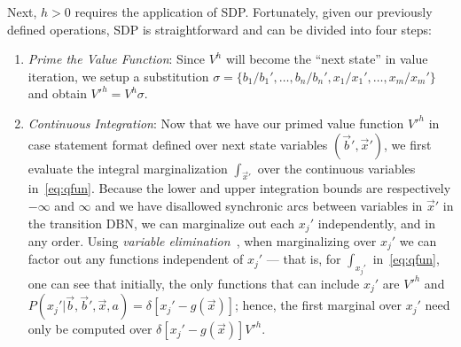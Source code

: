 \documentclass[letterpaper]{article}
\begin{document}
Next, $h > 0$ requires the application of SDP.  
Fortunately, given our previously defined
operations, SDP is straightforward and can be divided into four 
steps: 
\begin{enumerate}
\item {\it Prime the Value Function}: Since $V^{h}$ will become
the ``next state'' in value iteration, we setup a substitution
$\sigma = \{ b_1 / b_1', \ldots, b_n / b_n', x_1 / x_1', \ldots, x_m / x_m' \}$
and obtain $V'^{h} = V^{h}\sigma$.

\item {\it Continuous Integration}: Now that we have our primed value
function $V'^{h}$ in case statement format defined over next state
variables $(\vec{b}',\vec{x}')$, we first evaluate the integral
marginalization $\int_{\vec{x}'}$ over the continuous variables
in~\eqref{eq:qfun}.  Because the lower and upper integration bounds
are respectively $-\infty$ and $\infty$
and we have
disallowed synchronic arcs between variables in $\vec{x}'$ 
in the transition DBN, we can marginalize out each
$x_j'$ independently, and in any order.  Using 
\emph{variable elimination}~\cite{varelim}, when marginalizing
over $x_j'$ we can factor out any functions independent of $x_j'$ --- 
that is, for $\int_{x_j'}$ in~\eqref{eq:qfun}, 
one can see that initially, 
the only functions that can include $x_j'$ are $V'^{h}$
and $P(x_j'|\vec{b},\vec{b}',\vec{x},a) = \delta[x_j' - g(\vec{x})]$; 
hence, the first marginal over $x_j'$ need only be computed over
$\delta[x_j' - g(\vec{x})] V'^{h}$.


\end{enumerate}
\end{document}
